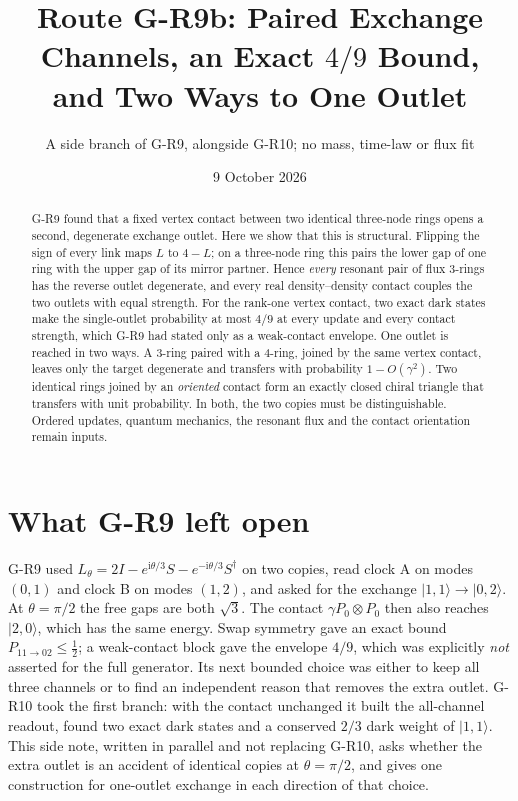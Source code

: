 \documentclass[11pt,a4paper]{article}
\title{Route G-R9b: Paired Exchange Channels, an Exact $4/9$ Bound,\\and Two Ways to One Outlet}
\author{A side branch of G-R9, alongside G-R10; no mass, time-law or flux fit}
\date{9 October 2026}
\newcommand{\ii}{\mathrm i}
\newcommand{\ket}[1]{|#1\rangle}
\begin{document}
\maketitle
\begin{abstract}
G-R9 found that a fixed vertex contact between two identical three-node
rings opens a second, degenerate exchange outlet. Here we show that this
is structural. Flipping the sign of every link maps $L$ to $4-L$; on a
three-node ring this pairs the lower gap of one ring with the upper gap of
its mirror partner. Hence \emph{every} resonant pair of flux 3-rings has
the reverse outlet degenerate, and every real density--density contact
couples the two outlets with equal strength. For the rank-one vertex
contact, two exact dark states make the single-outlet probability at most
$4/9$ at every update and every contact strength, which G-R9 had stated
only as a weak-contact envelope. One outlet is reached in two ways. A
3-ring paired with a 4-ring, joined by the same vertex contact, leaves only
the target degenerate and transfers with probability $1-O(\gamma^2)$. Two
identical rings joined by an \emph{oriented} contact form an exactly closed
chiral triangle that transfers with unit probability. In both, the two
copies must be distinguishable. Ordered updates, quantum mechanics, the
resonant flux and the contact orientation remain inputs.
\end{abstract}

\section{What G-R9 left open}
G-R9 used $L_\theta=2I-e^{\ii\theta/3}S-e^{-\ii\theta/3}S^\dagger$ on two
copies, read clock A on modes $(0,1)$ and clock B on modes $(1,2)$, and
asked for the exchange $\ket{1,1}\to\ket{0,2}$. At $\theta=\pi/2$ the free
gaps are both $\sqrt3$. The contact $\gamma P_0\otimes P_0$ then also
reaches $\ket{2,0}$, which has the same energy. Swap symmetry gave an exact
bound $P_{11\to02}\le\tfrac12$; a weak-contact block gave the envelope
$4/9$, which was explicitly \emph{not} asserted for the full generator.
Its next bounded choice was either to keep all three channels or to find
an independent reason that removes the extra outlet. G-R10 took the first
branch: with the contact unchanged it built the all-channel readout,
found two exact dark states and a conserved $2/3$ dark weight of
$\ket{1,1}$. This side note, written in parallel and not replacing G-R10,
asks whether the extra outlet is an accident of identical copies at
$\theta=\pi/2$, and gives one construction for one-outlet exchange in each
direction of that choice.
\end{document}
